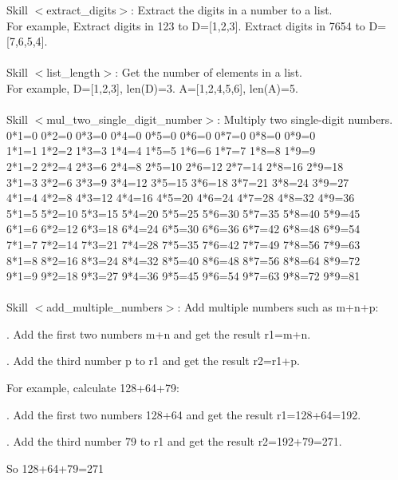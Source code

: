 \documentclass{article} %
\begin{document}
\newpage

\begin{tcolorbox}[title = {Skills for Multiplication}, colback = Apricot!25!white, colframe = BrickRed!75!black] 
Skill $<$extract\_digits$>$: Extract the digits in a number to a list.  \\
For example, Extract digits in 123 to D=[1,2,3]. Extract digits in 7654 to D=[7,6,5,4]. \\ \\

Skill $<$list\_length$>$: Get the number of elements in a list.  \\
For example, D=[1,2,3], len(D)=3. A=[1,2,4,5,6], len(A)=5. \\ \\

Skill $<$mul\_two\_single\_digit\_number$>$: Multiply two single-digit numbers.  \\
0*1=0 0*2=0 0*3=0 0*4=0 0*5=0 0*6=0 0*7=0 0*8=0 0*9=0 \\
1*1=1 1*2=2 1*3=3 1*4=4 1*5=5 1*6=6 1*7=7 1*8=8 1*9=9 \\
2*1=2 2*2=4 2*3=6 2*4=8 2*5=10 2*6=12 2*7=14 2*8=16 2*9=18 \\
3*1=3 3*2=6 3*3=9 3*4=12 3*5=15 3*6=18 3*7=21 3*8=24 3*9=27 \\
4*1=4 4*2=8 4*3=12 4*4=16 4*5=20 4*6=24 4*7=28 4*8=32 4*9=36 \\
5*1=5 5*2=10 5*3=15 5*4=20 5*5=25 5*6=30 5*7=35 5*8=40 5*9=45 \\
6*1=6 6*2=12 6*3=18 6*4=24 6*5=30 6*6=36 6*7=42 6*8=48 6*9=54 \\
7*1=7 7*2=14 7*3=21 7*4=28 7*5=35 7*6=42 7*7=49 7*8=56 7*9=63 \\
8*1=8 8*2=16 8*3=24 8*4=32 8*5=40 8*6=48 8*7=56 8*8=64 8*9=72 \\
9*1=9 9*2=18 9*3=27 9*4=36 9*5=45 9*6=54 9*7=63 9*8=72 9*9=81 \\ \\

Skill $<$add\_multiple\_numbers$>$: Add multiple numbers such as m+n+p: 


. Add the first two numbers m+n and get the result r1=m+n. 

. Add the third number p to r1 and get the result r2=r1+p.  

For example, calculate 128+64+79: 

. Add the first two numbers 128+64 and get the result r1=128+64=192. 

. Add the third number 79 to r1 and get the result r2=192+79=271. 

\quad So 128+64+79=271       
\end{tcolorbox}
\noindent\begin{minipage}{\textwidth}  
 \label{Tab:simple_mul_skill}
\end{minipage}
\end{document}
